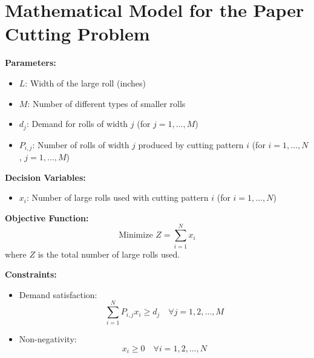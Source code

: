 \documentclass{article}
\begin{document}
\section*{Mathematical Model for the Paper Cutting Problem}

\textbf{Parameters:}
\begin{itemize}
    \item $L$: Width of the large roll (inches)
    \item $M$: Number of different types of smaller rolls
    \item $d_j$: Demand for rolls of width $j$ (for $j = 1, \ldots, M$)
    \item $P_{i,j}$: Number of rolls of width $j$ produced by cutting pattern $i$ (for $i = 1, \ldots, N$, $j = 1, \ldots, M$)
\end{itemize}

\textbf{Decision Variables:}
\begin{itemize}
    \item $x_i$: Number of large rolls used with cutting pattern $i$ (for $i = 1, \ldots, N$)
\end{itemize}

\textbf{Objective Function:}
\[
\text{Minimize } Z = \sum_{i=1}^{N} x_i
\]
where $Z$ is the total number of large rolls used.

\textbf{Constraints:}
\begin{itemize}
    \item Demand satisfaction:
    \[
    \sum_{i=1}^{N} P_{i,j} x_i \geq d_j \quad \forall j = 1, 2, \ldots, M
    \]
    
    \item Non-negativity:
    \[
    x_i \geq 0 \quad \forall i = 1, 2, \ldots, N
    \]
\end{itemize}
\end{document}
